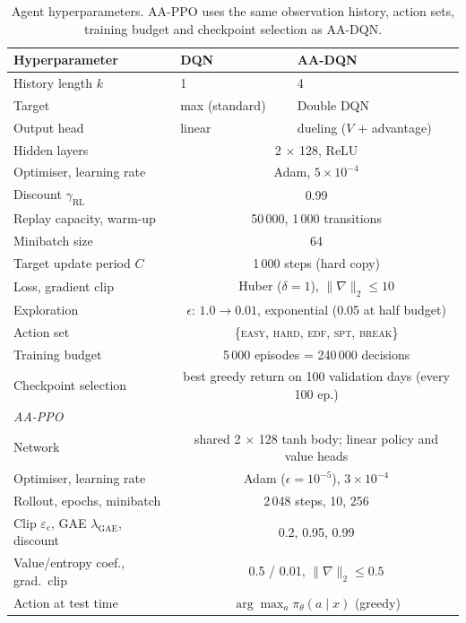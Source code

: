 \begin{table}[!htbp]
\centering
\caption{Agent hyperparameters. AA-PPO uses the same observation history, action sets, training budget and checkpoint selection as AA-DQN.}
\label{tab:hparams}
\footnotesize
\begin{tabular}{lll}
\toprule
Hyperparameter & DQN & AA-DQN \\
\midrule
History length $k$ & 1 & 4 \\
Target & max (standard) & Double DQN \\
Output head & linear & dueling ($V$ + advantage) \\
Hidden layers & \multicolumn{2}{c}{2 $\times$ 128, ReLU} \\
Optimiser, learning rate & \multicolumn{2}{c}{Adam, $5\times10^{-4}$} \\
Discount $\gamma_{\mathrm{RL}}$ & \multicolumn{2}{c}{0.99} \\
Replay capacity, warm-up & \multicolumn{2}{c}{50\,000, 1\,000 transitions} \\
Minibatch size & \multicolumn{2}{c}{64} \\
Target update period $C$ & \multicolumn{2}{c}{1\,000 steps (hard copy)} \\
Loss, gradient clip & \multicolumn{2}{c}{Huber ($\delta=1$), $\|\nabla\|_2\le10$} \\
Exploration & \multicolumn{2}{c}{$\epsilon$: $1.0\rightarrow0.01$, exponential (0.05 at half budget)} \\
Action set & \multicolumn{2}{c}{\{\textsc{easy}, \textsc{hard}, \textsc{edf}, \textsc{spt}, \textsc{break}\}} \\
Training budget & \multicolumn{2}{c}{5\,000 episodes = 240\,000 decisions} \\
Checkpoint selection & \multicolumn{2}{c}{best greedy return on 100 validation days (every 100 ep.)} \\
\midrule
\multicolumn{3}{l}{\emph{AA-PPO}} \\
Network & \multicolumn{2}{c}{shared 2 $\times$ 128 tanh body; linear policy and value heads} \\
Optimiser, learning rate & \multicolumn{2}{c}{Adam ($\epsilon=10^{-5}$), $3\times10^{-4}$} \\
Rollout, epochs, minibatch & \multicolumn{2}{c}{2\,048 steps, 10, 256} \\
Clip $\varepsilon_{\mathrm{c}}$, GAE $\lambda_{\mathrm{GAE}}$, discount & \multicolumn{2}{c}{0.2, 0.95, 0.99} \\
Value/entropy coef., grad.\ clip & \multicolumn{2}{c}{0.5 / 0.01, $\|\nabla\|_2\le0.5$} \\
Action at test time & \multicolumn{2}{c}{$\arg\max_a\pi_\theta(a\mid x)$ (greedy)} \\
\bottomrule
\end{tabular}
\end{table}
